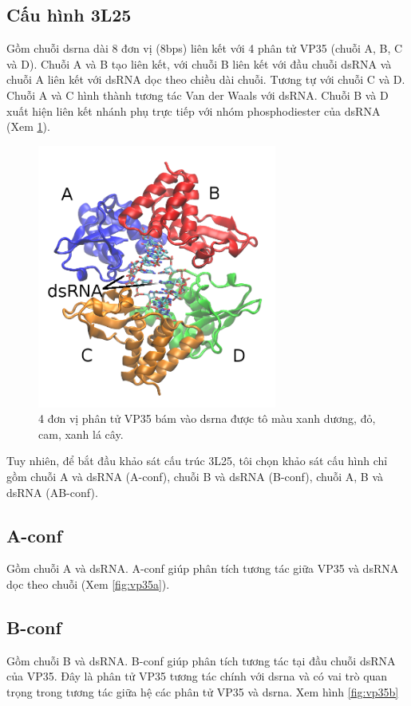 \documentclass[12pt,a4paper,reqno, oneside]{book}
\begin{document}
	\subsection{Cấu hình 3L25}
	\hspace{18pt}
		Gồm chuỗi \gls{dsrna} dài 8 đơn vị (8bps) liên kết với 4 phân tử VP35 (chuỗi A, B, C và D). Chuỗi A và B tạo liên kết, với chuỗi B liên kết với đầu chuỗi dsRNA và chuỗi A liên kết với dsRNA dọc theo chiều dài chuỗi. Tương tự với chuỗi C và D. Chuỗi A và C hình thành tương tác Van der Waals với dsRNA. Chuỗi B và D xuất hiện liên kết nhánh phụ trực tiếp với nhóm phosphodiester của dsRNA\cite{Leung2010} (Xem \ref{fig:vp35}).
		\begin{figure}[h]
		\centering
		\includegraphics[width=0.7\textwidth,natwidth=610,natheight=642]{VP35.png}
		\caption{4 đơn vị phân tử VP35 bám vào \gls{dsrna} được tô màu xanh dương, đỏ, cam, xanh lá cây.}
		\label{fig:vp35}
		\end{figure}
		Tuy nhiên, để bắt đầu khảo sát cấu trúc 3L25, tôi chọn khảo sát cấu hình chỉ gồm chuỗi A và dsRNA (A-conf), chuỗi B và dsRNA (B-conf), chuỗi A, B và dsRNA (AB-conf).
	\subsection{A-conf}
	\hspace{18pt}
		Gồm chuỗi A và dsRNA. A-conf giúp phân tích tương tác giữa VP35 và dsRNA dọc theo chuỗi (Xem \ref{fig:vp35a}).
		
	\subsection{B-conf}
	\hspace{18pt}
		Gồm chuỗi B và dsRNA. B-conf giúp phân tích tương tác tại đầu chuỗi dsRNA của VP35. Đây là phân tử VP35 tương tác chính với \gls{dsrna} và có vai trò quan trọng trong tương tác giữa hệ các phân tử VP35 và \gls{dsrna}. Xem hình \ref{fig:vp35b}
\end{document}

